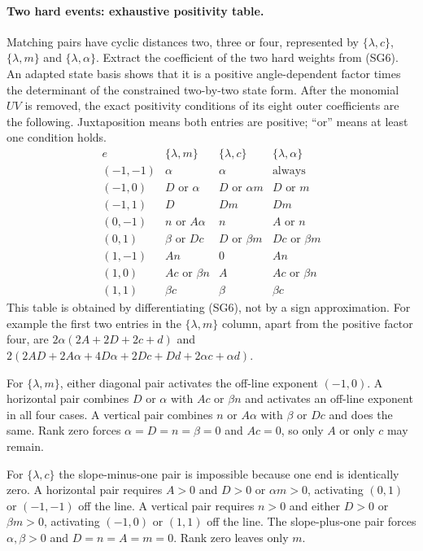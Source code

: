 \paragraph{Two hard events: exhaustive positivity table.}
Matching pairs have cyclic distances two, three or four, represented
by $\{\lambda,c\}$, $\{\lambda,m\}$ and
$\{\lambda,\alpha\}$. Extract the coefficient of the two hard
weights from (SG6). An adapted state basis shows that it is a
positive angle-dependent factor times the determinant of the
constrained two-by-two state form. After the monomial $UV$ is removed,
the exact positivity conditions of its eight outer coefficients are
the following. Juxtaposition means both entries are positive;
``or'' means at least one condition holds.
\[
\begin{array}{c|c|c|c}
 e&\{\lambda,m\}&\{\lambda,c\}&\{\lambda,\alpha\}\\\hline
(-1,-1)&\alpha&\alpha&\text{always}\\
(-1,0)&D\text{ or }\alpha&D\text{ or }\alpha m&D\text{ or }m\\
(-1,1)&D&Dm&Dm\\
(0,-1)&n\text{ or }A\alpha&n&A\text{ or }n\\
(0,1)&\beta\text{ or }Dc&D\text{ or }\beta m&Dc\text{ or }\beta m\\
(1,-1)&An&0&An\\
(1,0)&Ac\text{ or }\beta n&A&Ac\text{ or }\beta n\\
(1,1)&\beta c&\beta&\beta c
\end{array}                                                    \tag{NC14}
\]
This table is obtained by differentiating (SG6), not by a sign
approximation. For example the first two entries in the
$\{\lambda,m\}$ column, apart from the positive factor four, are
$2\alpha(2A+2D+2c+d)$ and
$2(2AD+2A\alpha+4D\alpha+2Dc+Dd+2\alpha c+\alpha d)$.

For $\{\lambda,m\}$, either diagonal pair activates the off-line
exponent $(-1,0)$. A horizontal pair combines $D$ or $\alpha$ with
$Ac$ or $\beta n$ and activates an off-line exponent in all four
cases. A vertical pair combines $n$ or $A\alpha$ with $\beta$ or
$Dc$ and does the same. Rank zero forces
$\alpha=D=n=\beta=0$ and $Ac=0$, so only $A$ or only $c$ may remain.

For $\{\lambda,c\}$ the slope-minus-one pair is impossible because
one end is identically zero. A horizontal pair requires $A>0$ and
$D>0$ or $\alpha m>0$, activating $(0,1)$ or $(-1,-1)$ off the
line. A vertical pair requires $n>0$ and either $D>0$ or
$\beta m>0$, activating $(-1,0)$ or $(1,1)$ off the line.
The slope-plus-one pair forces $\alpha,\beta>0$ and
$D=n=A=m=0$. Rank zero leaves only $m$.

